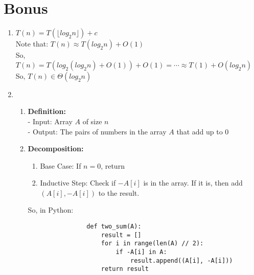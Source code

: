 \documentclass[a4paper]{article}
\begin{document}
\newpage
\section{Bonus}
    \begin{enumerate}
        \item $T(n) = T(\lfloor log_2 n \rfloor) + c$ \\ 
        
        Note that: $T(n) \approx T(log_2 n) + O(1)$ \\

        So, $T(n) = T(log_2 (log_2 n) + O(1)) + O(1) = \cdots \approx T(1) + O(log_2 n)$ \\

        So, $T(n) \in \Theta(log_2 n)$ \\

        
        \item \begin{enumerate}
            \item \textbf{Definition:} \\
            - Input: Array $A$ of size $n$ \\
            - Output: The pairs of numbers in the array $A$ that add up to $0$ \\

            \item \textbf{Decomposition:} \\
            \begin{enumerate}
                \item Base Case: If $n = 0$, return \\
                \item Inductive Step: Check if $-A[i]$ is in the array. If it is, then add $(A[i], -A[i])$ to the result. \\
            \end{enumerate}

            So, in Python:
            \lstset{language=Python}
            \begin{lstlisting}
                def two_sum(A):
                    result = []
                    for i in range(len(A) // 2):
                        if -A[i] in A:
                            result.append((A[i], -A[i]))
                    return result
            \end{lstlisting}


\end{enumerate}
\end{enumerate}
\end{document}
